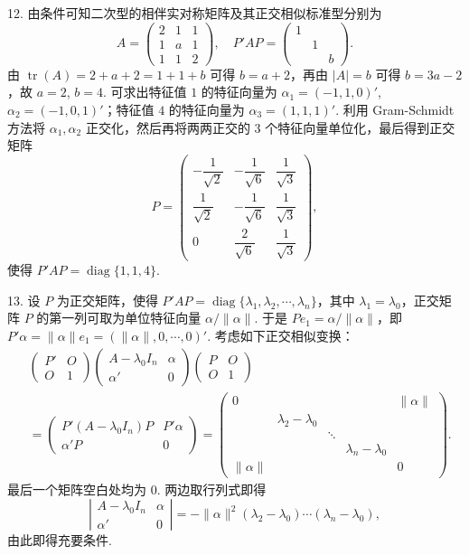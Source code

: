 \documentclass[UTF8, 12pt, fontset=fandol, oneside]{ctexart}
\begin{document}
12. 由条件可知二次型的相伴实对称矩阵及其正交相似标准型分别为
\[
A=\begin{pmatrix}
2&1&1\\
1&a&1\\
1&1&2
\end{pmatrix},\quad
P'AP=\begin{pmatrix}
1&&\\
&1&\\
&&b
\end{pmatrix}.
\]
由 $\operatorname{tr}(A)=2+a+2=1+1+b$ 可得 $b=a+2$，再由 $|A|=b$ 可得 $b=3a-2$，故 $a=2$, $b=4$. 可求出特征值 $1$ 的特征向量为 $\alpha_1=(-1,1,0)'$, $\alpha_2=(-1,0,1)'$；特征值 $4$ 的特征向量为 $\alpha_3=(1,1,1)'$. 利用 Gram-Schmidt 方法将 $\alpha_1,\alpha_2$ 正交化，然后再将两两正交的 $3$ 个特征向量单位化，最后得到正交矩阵
\[
P=\begin{pmatrix}
-\dfrac{1}{\sqrt{2}}&-\dfrac{1}{\sqrt{6}}&\dfrac{1}{\sqrt{3}}\\
\dfrac{1}{\sqrt{2}}&-\dfrac{1}{\sqrt{6}}&\dfrac{1}{\sqrt{3}}\\
0&\dfrac{2}{\sqrt{6}}&\dfrac{1}{\sqrt{3}}
\end{pmatrix},
\]
使得 $P'AP=\operatorname{diag}\{1,1,4\}$.

13. 设 $P$ 为正交矩阵，使得 $P'AP=\operatorname{diag}\{\lambda_1,\lambda_2,\cdots,\lambda_n\}$，其中 $\lambda_1=\lambda_0$，正交矩阵 $P$ 的第一列可取为单位特征向量 $\alpha/\|\alpha\|$. 于是 $Pe_1=\alpha/\|\alpha\|$，即 $P'\alpha=\|\alpha\|e_1=(\|\alpha\|,0,\cdots,0)'$. 考虑如下正交相似变换：
\[
\begin{aligned}
&\begin{pmatrix}
P'&O\\
O&1
\end{pmatrix}
\begin{pmatrix}
A-\lambda_0I_n&\alpha\\
\alpha'&0
\end{pmatrix}
\begin{pmatrix}
P&O\\
O&1
\end{pmatrix}\\
&=
\begin{pmatrix}
P'(A-\lambda_0I_n)P&P'\alpha\\
\alpha'P&0
\end{pmatrix}
=
\begin{pmatrix}
0&&&&\|\alpha\|\\
&\lambda_2-\lambda_0&&&\\
&&\ddots&&\\
&&&\lambda_n-\lambda_0&\\
\|\alpha\|&&&&0
\end{pmatrix}.
\end{aligned}
\]
最后一个矩阵空白处均为 $0$. 两边取行列式即得
\[
\left|\begin{matrix}
A-\lambda_0I_n&\alpha\\
\alpha'&0
\end{matrix}\right|
=-\|\alpha\|^2(\lambda_2-\lambda_0)\cdots(\lambda_n-\lambda_0),
\]
由此即得充要条件.
\end{document}
